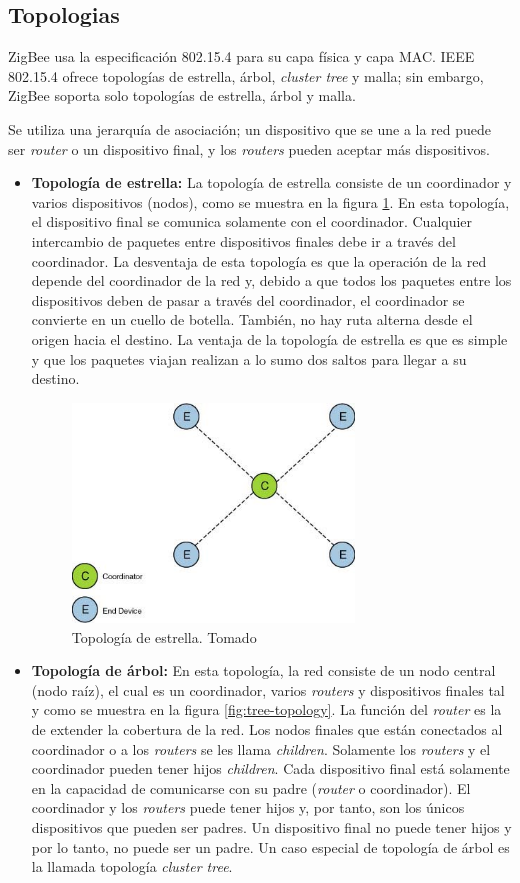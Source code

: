 \documentclass[10pt,journal,compsoc]{IEEEtran}
\begin{document}
\subsection{Topologias}
ZigBee usa la especificación 802.15.4 para su capa física y capa MAC. IEEE 802.15.4 ofrece topologías de estrella, árbol, \emph{cluster tree} y malla; sin embargo, ZigBee soporta solo topologías de estrella, árbol y malla.

Se utiliza una jerarquía de asociación; un dispositivo que se une a la red puede ser \emph{router} o un dispositivo final, y los \emph{routers} pueden aceptar más dispositivos.

\begin{itemize}
    \item \textbf{Topología de estrella:} La topología de estrella consiste de un coordinador y varios dispositivos (nodos), como se muestra en la figura \ref{fig:star-topology}. En esta topología, el dispositivo final se comunica solamente con el coordinador. Cualquier intercambio de paquetes entre dispositivos finales debe ir a través del coordinador. La desventaja de esta topología es que la operación de la red depende del coordinador de la red y, debido a que todos los paquetes entre los dispositivos deben de pasar a través del coordinador, el coordinador se convierte en un cuello de botella. También, no hay ruta alterna desde el origen hacia el destino. La ventaja de la topología de estrella es que es simple y que los paquetes viajan realizan a lo sumo dos saltos para llegar a su destino.
    \begin{figure}[h]
        \centering
        \includegraphics[width=7.5cm]{star-topology}
        \caption{Topología de estrella. Tomado \cite{gshewender}}
        \label{fig:star-topology}
    \end{figure}
    \item \textbf{Topología de árbol:} En esta topología, la red consiste de un nodo central (nodo raíz), el cual es un coordinador, varios \emph{routers} y dispositivos finales tal y como se muestra en la figura \ref{fig:tree-topology}. La función del \emph{router} es la de extender la cobertura de la red. Los nodos finales que están conectados al coordinador o a los \emph{routers} se les llama \emph{children}. Solamente los \emph{routers} y el coordinador pueden tener  hijos \emph{children}. Cada dispositivo final está solamente en la capacidad de comunicarse con su padre (\emph{router} o coordinador). El coordinador y los \emph{routers} puede tener hijos y, por tanto, son los únicos dispositivos que pueden ser padres. Un dispositivo final no puede tener hijos y por lo tanto, no puede ser un padre. Un caso especial de topología de árbol es la llamada topología \emph{cluster tree}.

\end{itemize}
\end{document}
